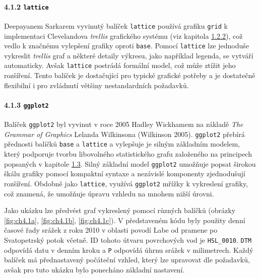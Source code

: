 \documentclass[12pt,]{article}
\let\oldparagraph\paragraph
\renewcommand{\paragraph}[1]{\oldparagraph{#1}\mbox{}}
\begin{document}
\hypertarget{lattice}{\paragraph{\texorpdfstring{4.1.2
\texttt{lattice}}{4.1.2 lattice}}\label{lattice}}

\qquad Deepayanem Sarkarem vyvinutý balíček \texttt{lattice} používá
grafiku \texttt{grid} k implementaci Clevelandova \emph{trellis}
grafického systému (viz kapitola \protect\hyperlink{cleveland}{1.2.2}),
což vedlo k značnému vylepšení grafiky oproti \texttt{base}. Pomocí
\texttt{lattice} lze jednoduše vykreslit \emph{trellis} graf a některé
detaily výkresu, jako například legenda, se vytváří automaticky. Avšak
\texttt{lattice} postrádá formální model, což může ztížit jeho
rozšíření. Tento balíček je dostačující pro typické grafické potřeby a
je dostatečně flexibilní i pro zvládnutí většiny nestandardních
požadavků.

\hypertarget{ggplot}{\paragraph{\texorpdfstring{4.1.3
\texttt{ggplot2}}{4.1.3 ggplot2}}\label{ggplot}}

\qquad Balíček \texttt{ggplot2} byl vyvinut v roce 2005 Hadley Wickhamem
na základě \emph{The Grammar of Graphics} Lelanda Wilkinsona (Wilkinson
2005). \texttt{ggplot2} přebírá přednosti balíčků \texttt{base} a
\texttt{lattice} a vylepšuje je silným základním modelem, který
podporuje tvorbu libovolného statistického grafu založeného na
principech popsaných v kapitole \protect\hyperlink{gg}{1.3}. Silný
základní model \texttt{ggplot2} umožňuje popsat širokou škálu grafiky
pomocí kompaktní syntaxe a nezávislé komponenty zjednodušují rozšíření.
Obdobně jako \texttt{lattice}, využívá \texttt{ggplot2} mřížky k
vykreslení grafiky, což znamená, že umožňuje úpravu vzhledu na mnohem
nižší úrovni.

\qquad Jako ukázku lze předvést graf vykreslený pomocí různých balíčků
(obrázky \ref{fig:ch4.1a}, \ref{fig:ch4.1b}, \ref{fig:ch4.1c}). V
představeném kódu byly použity denní časové řady srážek z roku 2010 v
oblasti povodí Labe od pramene po Svatopetrský potok včetně. ID tohoto
útvaru povrchových vod je \texttt{HSL\_0010}. \texttt{DTM} odpovídá datu
v denním kroku a \texttt{P} odpovídá úhrnu srážek v milimetrech. Každý
balíček má přednastavený počáteční vzhled, který lze upravovat dle
požadavků, avšak pro tuto ukázku bylo ponecháno základní nastavení.
\end{document}
